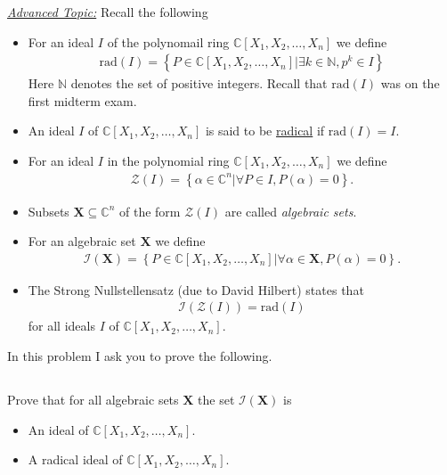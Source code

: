 \documentclass[10pt]{amsart}
\newcommand{\N}{\mathbb{N}}
\newcommand{\C}{\mathbb{C}}
\newcommand{\rad}[1]{\text{rad}\left(#1\right)}
\begin{document}
\underline{\textit{Advanced Topic:}} Recall the following
\begin{itemize}
  \item For an ideal $I$ of the polynomail ring $\C[X_1,X_2,\ldots,X_n]$ we
    define
    \begin{align*}
      \rad{I}=\left\{P\in\C[X_1,X_2,\ldots,X_n]|\exists k\in\N,p^k\in I\right\}
    \end{align*}
    Here $\N$ denotes the set of positive integers. Recall that $\rad{I}$ was
    on the first midterm exam.

  \item An ideal $I$ of $\C[X_1,X_2,\ldots,X_n]$ is said to be
    \underline{radical} if $\rad{I}=I$.

  \item For an ideal $I$ in the polynomial ring $\C[X_1,X_2,\ldots,X_n]$ we
    define
    \begin{align*}
      \mathscr{Z}(I)=\left\{\alpha\in\C^n\vert\forall P\in
        I,P(\alpha)=0\right\}.
    \end{align*}

  \item Subsets $\mathbf{X}\subseteq \C^n$ of the form $\mathscr{Z}(I)$ are called
    \textit{algebraic sets}.

  \item For an algebraic set $\mathbf{X}$ we define
    \begin{align*}
      \mathscr{I}(\mathbf{X})=\left\{P\in\C[X_1,X_2,\ldots,X_n]\vert\forall
        \alpha\in\mathbf{X},P(\alpha)=0\right\}.
    \end{align*}

  \item The Strong Nullstellensatz (due to David Hilbert) states that
    \begin{align*}
      \mathscr{I}(\mathscr{Z}(I))=\rad{I}
    \end{align*}
    for all ideals $I$ of $\C[X_1,X_2,\ldots,X_n]$.
\end{itemize}
In this problem I ask you to prove the following.

\subsection{}%
\label{sub:4a}

Prove that for all algebraic sets $\mathbf{X}$ the set
$\mathscr{I}(\mathbf{X})$ is
\begin{itemize}
  \item An ideal of $\C[X_1,X_2,\ldots,X_n]$.
  \item A radical ideal of $\C[X_1,X_2,\ldots,X_n]$.
\end{itemize}
\end{document}
